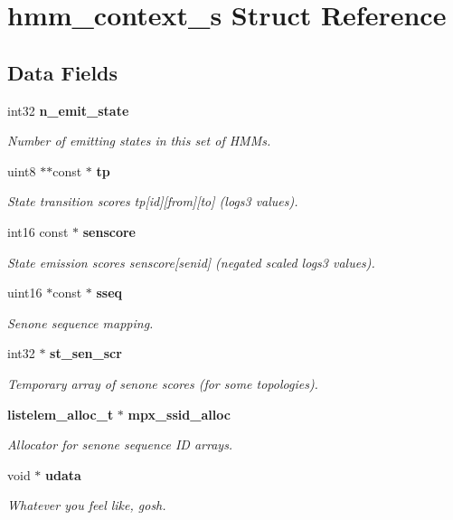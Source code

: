 \section{hmm\-\_\-context\-\_\-s Struct Reference}
\label{structhmm__context__s}
\subsection*{Data Fields}
\begin{DoxyCompactItemize}
\item 
int32 {\bf n\-\_\-emit\-\_\-state}
\begin{DoxyCompactList}\small\item\em Number of emitting states in this set of H\-M\-Ms. \end{DoxyCompactList}\item 
uint8 $\ast$$\ast$const $\ast$ {\bf tp}
\begin{DoxyCompactList}\small\item\em State transition scores tp[id][from][to] (logs3 values). \end{DoxyCompactList}\item 
int16 const $\ast$ {\bf senscore}
\begin{DoxyCompactList}\small\item\em State emission scores senscore[senid] (negated scaled logs3 values). \end{DoxyCompactList}\item 
uint16 $\ast$const $\ast$ {\bf sseq}
\begin{DoxyCompactList}\small\item\em Senone sequence mapping. \end{DoxyCompactList}\item 
int32 $\ast$ {\bf st\-\_\-sen\-\_\-scr}
\begin{DoxyCompactList}\small\item\em Temporary array of senone scores (for some topologies). \end{DoxyCompactList}\item 
{\bf listelem\-\_\-alloc\-\_\-t} $\ast$ {\bf mpx\-\_\-ssid\-\_\-alloc}
\begin{DoxyCompactList}\small\item\em Allocator for senone sequence I\-D arrays. \end{DoxyCompactList}\item 
void $\ast$ {\bf udata}
\begin{DoxyCompactList}\small\item\em Whatever you feel like, gosh. \end{DoxyCompactList}\end{DoxyCompactItemize}


